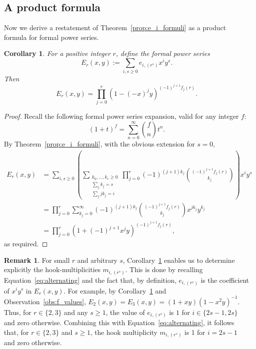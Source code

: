 \documentclass[10pt]{article}
\newtheorem{corollary}[theorem]{Corollary}
\theoremstyle{definition}
\newtheorem{remark}[theorem]{Remark}
\begin{document}
	
\subsection{A product formula}
\label{sec:prod}
	
Now we derive a restatement of Theorem~\ref{prop:e_i_formuli} as a product formula for formal power series. 

\begin{corollary}\label{power_series_form}
    For a positive integer $r$, define the formal power series
    \[
        E_r(x,y) := \sum_{i,s \ge 0} e_{i,(r^s)} x^i y^s.
    \]
    Then
    \[
        E_r(x,y) 
        = \prod_{j=0}^{r} (1 - (-x)^j y)^{(-1)^{j+1}f_j(r)}.
    \]
\end{corollary}
	
\begin{proof}
    Recall the following formal power series expansion, valid for any integer $f$:
    \[
        (1+t)^{f} = \sum_{n=0}^\infty \binom{f}{n} t^n.
    \]
    By Theorem~\ref{prop:e_i_formuli},
    with the obvious extension for $s=0$,
    \begin{align*}
        E_r(x,y) 
        &= \sum_{i,s \ge 0} \left(
        \sum_{\substack{k_0,\ldots,k_r \ge 0 \\ \sum_j k_j=s \\ \sum_j jk_j = i}} 
        \prod_{j = 0}^{r}
        (-1)^{(j+1)k_j} \binom{(-1)^{j+1} f_j(r)}{k_j}
        \right) x^i y^s \\
        &= \prod_{j=0}^{r} \sum_{k_j=0}^\infty
        (-1)^{(j+1)k_j} \binom{(-1)^{j+1} f_j(r)}{k_j}
        x^{jk_j} y^{k_j} \\
        &= \prod_{j=0}^{r} (1 + (-1)^{j+1} x^j y)^{(-1)^{j+1}f_j(r)},
    \end{align*}
    as required.
\end{proof}
	
\begin{remark}\label{rem:le_3}
    For small $r$ and arbitrary $s$, Corollary~\ref{power_series_form}  enables us to determine explicitly the hook-multiplicities $m_{i,(r^s)}$. 
    This is done by recalling Equation~\eqref{eq:alternating} and the fact that, by definition, $e_{i,(r^s)}$ is the coefficient of $x^i y^s$ in $E_r(x,y)$. 
    For example, by Corollary~\ref{power_series_form} and Observation~\ref{obs:f_values}, 
    $E_2(x,y) = E_3(x,y) = (1+xy)(1-x^2y)^{-1}$. 
    Thus, for $r \in \{2,3\}$ and any $s \ge 1$, the value of $e_{i,(r^s)}$ is $1$ for $i \in \{2s-1,2s\}$ and zero otherwise. 
    Combining this with Equation~\eqref{eq:alternating}, 
    it follows that, for $r \in \{2,3\}$ and $s \ge 1$, the hook multiplicity $m_{i,(r^s)}$ 
    is 1 for $i = 2s-1$ and zero otherwise. 
\end{remark}	
\end{document}
